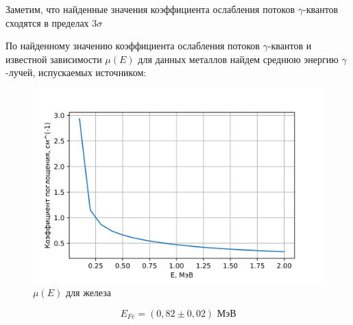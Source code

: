 \documentclass[a4paper,12pt]{report}
\begin{document}
Заметим, что найденные значения коэффициента ослабления потоков $\gamma$-квантов сходятся в пределах $3\sigma$

По найденному значению коэффициента ослабления потоков $\gamma$-квантов и известной зависимости $\mu(E)$ для данных металлов найдем среднюю энергию $\gamma$-лучей, испускаемых источником:

	\begin{figure}[H]
		\centering
		\includegraphics[width=0.8\linewidth]{mu(E)_fe.png}
		\caption{$\mu(E)$ для железа}
		\label{ris mu}
	\end{figure}
	
\begin{equation*}
E_{Fe} = (0,82\pm0,02)\text{ МэВ}
\end{equation*}	
	
\end{document}
